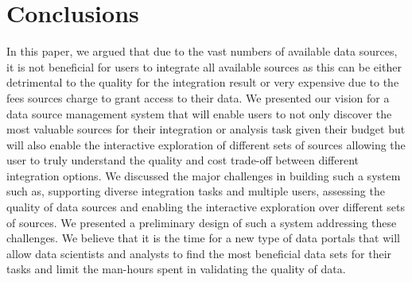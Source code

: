 \documentclass{sig-alternate}
\begin{document}
\section{Conclusions}
\label{sec:conclusion}
In this paper, we argued that due to the vast numbers of available data sources, it is not beneficial for users to integrate all available sources as this can be either detrimental to the quality for the integration result or very expensive due to the fees sources charge to grant access to their data. We presented our vision for a data source management system that will enable users to not only discover the most valuable sources for their integration or analysis task given their budget but will also enable the interactive exploration of different sets of sources allowing the user to truly understand the quality and cost trade-off between different integration options. We discussed the major challenges in building such a system such as, supporting diverse integration tasks and multiple users, assessing the quality of data sources and enabling the interactive exploration over different sets of sources. We presented a preliminary design of such a system addressing these challenges. We believe that it is the time for a new type of data portals that will allow data scientists and analysts to find the most beneficial data sets for their tasks and limit the man-hours spent in validating the quality of data. 
\end{document}
